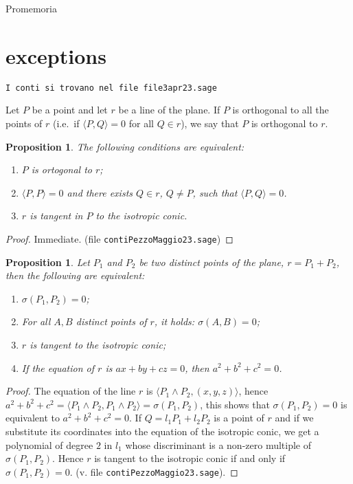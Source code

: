 \documentclass{amsart}
\theoremstyle{plain}
\newtheorem{prop}[theorem]{Proposition}
\theoremstyle{definition}
\newcommand{\scl}[2]{\langle #1, #2 \rangle}
\begin{document}
Promemoria
\section{exceptions}
\verb+I conti si trovano nel file file3apr23.sage+

\bigskip
Let $P$ be a point and let $r$ be a line of the plane. If $P$ is
orthogonal to all the points of $r$ (i.e.\ if $\scl{P}{Q} = 0$ for
all $Q \in r$), we say that $P$ is orthogonal to $r$.

\begin{prop}
  The following conditions are equivalent:
  \begin{enumerate}
  \item $P$ is ortogonal to $r$;
  \item $\scl{P}{P} = 0$ and there exists $Q\in r$, $Q\not= P$, such
    that $\scl{P}{Q} = 0$.
  \item $r$ is tangent in $P$ to the isotropic conic. 
  \end{enumerate}
\end{prop}
\begin{proof}
Immediate. (file \verb+contiPezzoMaggio23.sage+)
\end{proof}


\begin{prop}
Let $P_1$ and $P_2$ be two distinct points of the plane, $r=P_1+P_2$,
then the following are equivalent:
\begin{enumerate}
\item $\sigma(P_1, P_2) = 0$;
\item For all $A, B$ distinct points of $r$, it holds: $\sigma(A, B) = 0$;
\item $r$ is tangent to the isotropic conic;
\item If the equation of $r$ is $ax+by+cz = 0$, then $a^2+b^2+c^2 = 0$.
\end{enumerate}
\label{prop2x}
\end{prop}
\begin{proof}
  The equation of the line $r$ is $\scl{P_1\wedge P_2}{(x, y, z)}$, hence
  $a^2+b^2+c^2 = \scl{P_1 \wedge P_2}{P_1 \wedge P_2} = \sigma(P_1, P_2)$,
  this shows that $\sigma(P_1, P_2) = 0$ is equivalent to $a^2+b^2+c^2=0$.
  If $Q = l_1P_1+l_2P_2$ is a point of $r$ and if we substitute its
  coordinates into the equation of the isotropic conic, we get a polynomial
  of degree $2$ in $l_1$ whose discriminant is a non-zero multiple of
  $\sigma(P_1, P_2)$. Hence $r$ is tangent to the isotropic conic if and
  only if $\sigma(P_1, P_2) = 0$. (v. file \texttt{contiPezzoMaggio23.sage}).
\end{proof}
\end{document}
